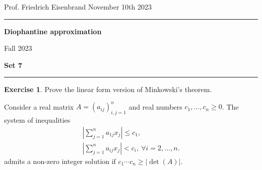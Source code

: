 \documentclass[12pt,a4paper]{article}
\date{}
\theoremstyle{plain}
\newtheorem*{Sol*}{Solution}
\theoremstyle{definition}
\newtheorem{Ex}{Exercise}
\newif\ifsolutions
\newcommand{\exercise}[2]{
			\begin{Ex} #1 \end{Ex}
			\ifsolutions  \begin{Sol*} #2 \end{Sol*} \bigskip \else \bigskip  \fi
		}
\begin{document}
\begin{center}
{Prof. Friedrich Eisenbrand \hfill November 10th 2023}
\end{center}
	
\hrule\vspace{\baselineskip}

\begin{center}
\textbf{Diophantine approximation}

Fall 2023

\bigskip

\textbf{Set 7}
\ifsolutions{\textbf{- Solutions}} \else{} \fi
\end{center}

\hrule\vspace{\baselineskip}




\exercise{
	Prove the linear form version of Minkowski's theorem.
	
	Consider a real matrix $A = (a_{ij})_{i,j=1}^n$ and real numbers $c_1, \dots, c_n \geq 0$. The system of inequalities
	\begin{gather*}
		\left| \sum_{j=1}^n a_{1j} x_j \right| \leq c_1, \\
		\left| \sum_{j=1}^n a_{ij} x_j \right| < c_i, \ \forall i=2, \dots, n.
	\end{gather*}
	admits a non-zero integer solution if $c_1 \cdots c_n \geq | \det(A) |.$
}
{}
\end{document}
